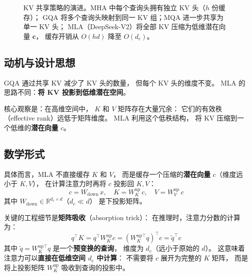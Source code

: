 \begin{figure}[htbp]
\caption{KV 共享策略的演进。MHA 中每个查询头拥有独立 KV 头（$h$ 份缓存）；
GQA 将多个查询头映射到同一 KV 组；MQA 进一步共享为单一 KV 头；
MLA（DeepSeek-V2）将全部 KV 压缩为低维潜在向量 $\mathbf{c}$，
缓存开销从 $O(hd)$ 降至 $O(d_c)$。}
\label{fig:kv-sharing}
\end{figure}

\subsection{动机与设计思想}

GQA 通过共享 KV 减少了 KV 头的数量，
但每个 KV 头的维度不变。
MLA 的思路不同：\textbf{将 KV 投影到低维潜在空间}。

核心观察是：在高维空间中，
$K$ 和 $V$ 矩阵存在大量冗余：
它们的有效秩（effective rank）远低于矩阵维度。
MLA 利用这个低秩结构，
将 KV 压缩到一个低维的\textbf{潜在向量} $c$。

\subsection{数学形式}

具体而言，MLA 不直接缓存 $K$ 和 $V$，
而是缓存一个压缩的\textbf{潜在向量} $c$（维度远小于 $K, V$），
在计算注意力时再将 $c$ 投影回 $K, V$：
\begin{equation}
  c = W_{\mathrm{down}} \, x, \quad
  K = W_K^{\mathrm{up}} \, c, \quad
  V = W_V^{\mathrm{up}} \, c
\end{equation}
其中 $W_{\mathrm{down}} \in \mathbb{R}^{d_c \times d}$（$d_c \ll d$）
是下投影矩阵。

关键的工程细节是\textbf{矩阵吸收}（absorption trick）：
在推理时，注意力分数的计算为：
\[
  q^\top K = q^\top W_K^{\mathrm{up}} c
  = (W_K^{\mathrm{up}\top} q)^\top c
  = \tilde{q}^\top c
\]
其中 $\tilde{q} = W_K^{\mathrm{up}\top} q$ 是一个\textbf{预变换的查询}，
维度为 $d_c$（远小于原始的 $d$）。
这意味着注意力可以\textbf{直接在低维空间 $d_c$ 中计算}：
不需要将 $c$ 展开为完整的 $K$ 矩阵，
而是将上投影矩阵 $W_K^{\mathrm{up}}$ 吸收到查询的投影中。

